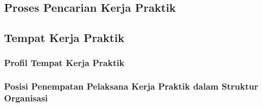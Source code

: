 \chapter{\babSatu}
\label{bab:1}

\section{Proses Pencarian Kerja Praktik}

\section{Tempat Kerja Praktik}
\subsection{Profil Tempat Kerja Praktik}
\subsection{Posisi Penempatan Pelaksana Kerja Praktik dalam Struktur Organisasi}
